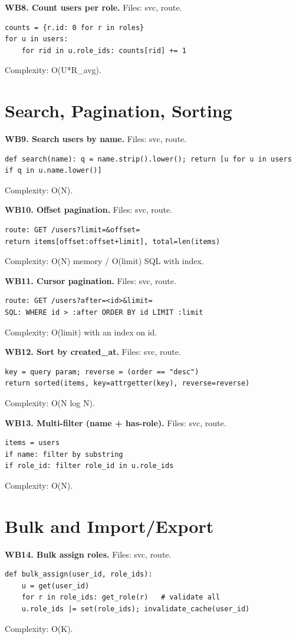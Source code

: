 \documentclass[11pt,a4paper]{report}
\begin{document}
\textbf{WB8. Count users per role.} Files: svc, route.
\begin{lstlisting}
counts = {r.id: 0 for r in roles}
for u in users:
    for rid in u.role_ids: counts[rid] += 1
\end{lstlisting}
Complexity: O(U*R\_avg).

\section{Search, Pagination, Sorting}

\textbf{WB9. Search users by name.} Files: svc, route.
\begin{lstlisting}
def search(name): q = name.strip().lower(); return [u for u in users if q in u.name.lower()]
\end{lstlisting}
Complexity: O(N).

\textbf{WB10. Offset pagination.} Files: svc, route.
\begin{lstlisting}
route: GET /users?limit=&offset=
return items[offset:offset+limit], total=len(items)
\end{lstlisting}
Complexity: O(N) memory / O(limit) SQL with index.

\textbf{WB11. Cursor pagination.} Files: svc, route.
\begin{lstlisting}
route: GET /users?after=<id>&limit=
SQL: WHERE id > :after ORDER BY id LIMIT :limit
\end{lstlisting}
Complexity: O(limit) with an index on id.

\textbf{WB12. Sort by created\_at.} Files: svc, route.
\begin{lstlisting}
key = query param; reverse = (order == "desc")
return sorted(items, key=attrgetter(key), reverse=reverse)
\end{lstlisting}
Complexity: O(N log N).

\textbf{WB13. Multi-filter (name + has-role).} Files: svc, route.
\begin{lstlisting}
items = users
if name: filter by substring
if role_id: filter role_id in u.role_ids
\end{lstlisting}
Complexity: O(N).

\section{Bulk and Import/Export}

\textbf{WB14. Bulk assign roles.} Files: svc, route.
\begin{lstlisting}
def bulk_assign(user_id, role_ids):
    u = get(user_id)
    for r in role_ids: get_role(r)   # validate all
    u.role_ids |= set(role_ids); invalidate_cache(user_id)
\end{lstlisting}
Complexity: O(K).
\end{document}
